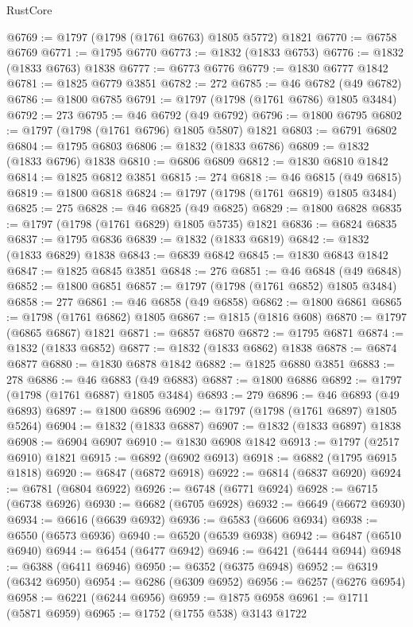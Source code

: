 \begin{lexlean}{RustCore}
\begin{coremodule}
@6769 := @1797 (@1798 (@1761 @6763) @1805 @5772) @1821
@6770 := @6758 @6769
@6771 := @1795 @6770
@6773 := @1832 (@1833 @6753)
@6776 := @1832 (@1833 @6763) @1838
@6777 := @6773 @6776
@6779 := @1830 @6777 @1842
@6781 := @1825 @6779 @3851
@6782 := 272
@6785 := @46 @6782 (@49 @6782)
@6786 := @1800 @6785
@6791 := @1797 (@1798 (@1761 @6786) @1805 @3484)
@6792 := 273
@6795 := @46 @6792 (@49 @6792)
@6796 := @1800 @6795
@6802 := @1797 (@1798 (@1761 @6796) @1805 @5807) @1821
@6803 := @6791 @6802
@6804 := @1795 @6803
@6806 := @1832 (@1833 @6786)
@6809 := @1832 (@1833 @6796) @1838
@6810 := @6806 @6809
@6812 := @1830 @6810 @1842
@6814 := @1825 @6812 @3851
@6815 := 274
@6818 := @46 @6815 (@49 @6815)
@6819 := @1800 @6818
@6824 := @1797 (@1798 (@1761 @6819) @1805 @3484)
@6825 := 275
@6828 := @46 @6825 (@49 @6825)
@6829 := @1800 @6828
@6835 := @1797 (@1798 (@1761 @6829) @1805 @5735) @1821
@6836 := @6824 @6835
@6837 := @1795 @6836
@6839 := @1832 (@1833 @6819)
@6842 := @1832 (@1833 @6829) @1838
@6843 := @6839 @6842
@6845 := @1830 @6843 @1842
@6847 := @1825 @6845 @3851
@6848 := 276
@6851 := @46 @6848 (@49 @6848)
@6852 := @1800 @6851
@6857 := @1797 (@1798 (@1761 @6852) @1805 @3484)
@6858 := 277
@6861 := @46 @6858 (@49 @6858)
@6862 := @1800 @6861
@6865 := @1798 (@1761 @6862) @1805
@6867 := @1815 (@1816 @608)
@6870 := @1797 (@6865 @6867) @1821
@6871 := @6857 @6870
@6872 := @1795 @6871
@6874 := @1832 (@1833 @6852)
@6877 := @1832 (@1833 @6862) @1838
@6878 := @6874 @6877
@6880 := @1830 @6878 @1842
@6882 := @1825 @6880 @3851
@6883 := 278
@6886 := @46 @6883 (@49 @6883)
@6887 := @1800 @6886
@6892 := @1797 (@1798 (@1761 @6887) @1805 @3484)
@6893 := 279
@6896 := @46 @6893 (@49 @6893)
@6897 := @1800 @6896
@6902 := @1797 (@1798 (@1761 @6897) @1805 @5264)
@6904 := @1832 (@1833 @6887)
@6907 := @1832 (@1833 @6897) @1838
@6908 := @6904 @6907
@6910 := @1830 @6908 @1842
@6913 := @1797 (@2517 @6910) @1821
@6915 := @6892 (@6902 @6913)
@6918 := @6882 (@1795 @6915 @1818)
@6920 := @6847 (@6872 @6918)
@6922 := @6814 (@6837 @6920)
@6924 := @6781 (@6804 @6922)
@6926 := @6748 (@6771 @6924)
@6928 := @6715 (@6738 @6926)
@6930 := @6682 (@6705 @6928)
@6932 := @6649 (@6672 @6930)
@6934 := @6616 (@6639 @6932)
@6936 := @6583 (@6606 @6934)
@6938 := @6550 (@6573 @6936)
@6940 := @6520 (@6539 @6938)
@6942 := @6487 (@6510 @6940)
@6944 := @6454 (@6477 @6942)
@6946 := @6421 (@6444 @6944)
@6948 := @6388 (@6411 @6946)
@6950 := @6352 (@6375 @6948)
@6952 := @6319 (@6342 @6950)
@6954 := @6286 (@6309 @6952)
@6956 := @6257 (@6276 @6954)
@6958 := @6221 (@6244 @6956)
@6959 := @1875 @6958
@6961 := @1711 (@5871 @6959)
@6965 := @1752 (@1755 @538) @3143 @1722

\end{coremodule}
\end{lexlean}
